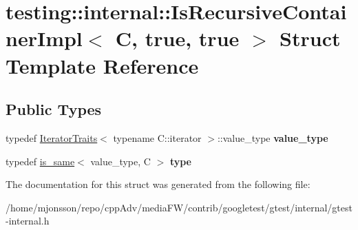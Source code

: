 \hypertarget{structtesting_1_1internal_1_1IsRecursiveContainerImpl_3_01C_00_01true_00_01true_01_4}{}\section{testing\+:\+:internal\+:\+:Is\+Recursive\+Container\+Impl$<$ C, true, true $>$ Struct Template Reference}
\label{structtesting_1_1internal_1_1IsRecursiveContainerImpl_3_01C_00_01true_00_01true_01_4}
\subsection*{Public Types}
\begin{DoxyCompactItemize}
\item 
\mbox{\label{structtesting_1_1internal_1_1IsRecursiveContainerImpl_3_01C_00_01true_00_01true_01_4_a8bbf5f5dec769e84b6f5a2e1fdb503e8}} 
typedef \hyperlink{structtesting_1_1internal_1_1IteratorTraits}{Iterator\+Traits}$<$ typename C\+::iterator $>$\+::value\+\_\+type {\bfseries value\+\_\+type}
\item 
\mbox{\label{structtesting_1_1internal_1_1IsRecursiveContainerImpl_3_01C_00_01true_00_01true_01_4_a6bf4fa07dd1c22c5d0ca4ed99c546e9c}} 
typedef \hyperlink{structtesting_1_1internal_1_1is__same}{is\+\_\+same}$<$ value\+\_\+type, C $>$ {\bfseries type}
\end{DoxyCompactItemize}


The documentation for this struct was generated from the following file\+:\begin{DoxyCompactItemize}
\item 
/home/mjonsson/repo/cpp\+Adv/media\+F\+W/contrib/googletest/gtest/internal/gtest-\/internal.\+h\end{DoxyCompactItemize}
